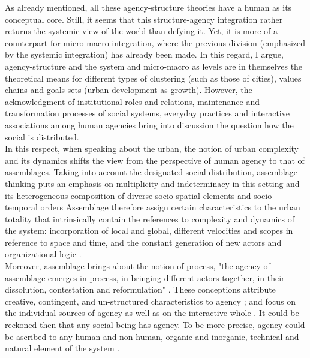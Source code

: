 \documentclass[11pt]{report}
\begin{document}
As already mentioned, all these agency-structure theories have a human as its conceptual core. Still, it seems that this structure-agency integration rather returns the systemic view of the world than defying it.
Yet, it is more of a counterpart for micro-macro integration, where the previous division (emphasized by the systemic integration) has already been made.
In this regard, I argue, agency-structure and the system and micro-macro as levels are in themselves the theoretical means for different types of clustering (such as those of cities), values chains and goals sets (urban development as growth).
However, the acknowledgment of institutional roles and relations, maintenance and transformation processes of social systems, everyday practices and interactive associations among human agencies bring into discussion the question how the social is distributed.
\\

In this respect, when speaking about the urban, the notion of urban complexity and its dynamics shifts the view from the perspective of human agency to that of assemblages. Taking into account the designated social distribution, assemblage thinking puts an emphasis on multiplicity and indeterminacy in this setting and its heterogeneous composition of diverse socio-spatial elements and socio-temporal orders \href{Anderson}{\citealt{anderson_assemblage_2011}}
Assemblage therefore assign certain characteristics to the urban totality that intrinsically contain the references to complexity and dynamics of the system: incorporation of local and global, different velocities and scopes in reference to space and time, and the constant generation of new actors and organizational logic \cite{Sassen 2007}.
\\

Moreover, assemblage brings about the notion of process, "the agency of assemblage emerges in process, in bringing different actors together, in their dissolution,  contestation  and  reformulation"
\href{McFarlane}{\citealt{mcfarlane_assemblage_2011}}.
These conceptions attribute creative, contingent, and un-structured characteristics to agency \href{Rafiee}{\citealt{rafiee_relationship_2014}};
\cite{Rafiee et al. 2014, McLeod 1987,Taylor 1991} and focus on the individual sources of agency as well as on the interactive whole \href{McFarlane}{\citealt{mcfarlane_assemblage_2011}}.
It could be reckoned then that any social being has agency. To be more precise, agency could be ascribed to any human and non-human, organic and inorganic, technical and natural element of the system \href{Anderson}{\cite{anderson_assemblage_2011}}.
\\
\end{document}
